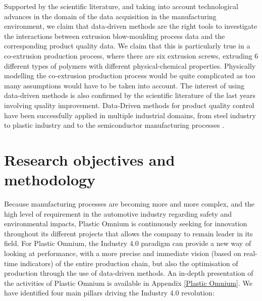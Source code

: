 Supported by the scientific literature, and taking into account technological advances in the domain of the data acquisition in the manufacturing environment, we claim that data-driven methods are the right tools to investigate the interactions between extrusion blow-moulding process data and the corresponding product quality data.  We claim that this is particularly true in a co-extrusion production process, where there are six extrusion screws, extruding 6 different types of polymers with different physical-chemical properties. Physically modelling the co-extrusion  production process would be quite complicated as too many assumptions would have to be taken into account. 
The interest of using data-driven methods is also confirmed by the scientific literature of the last years involving quality improvement. Data-Driven methods for product quality control have been successfully applied in multiple industrial domains, from steel industry \citep{lieber2013quality,li2018ensemble} to plastic industry \citep{chen2008neural,nagorny2017quality,nagorny2018generative,haeussler1996quality,tellaeche2013machine,sharma2017taguchi} and to the semiconductor manufacturing processes \citep{melhem2016regression,lenz2013data,jiang2020novel}.

\section{Research objectives and methodology} \label{Research objectives and methodology}

Because manufacturing processes are becoming more and more complex, and the high level of requirement in the automotive industry regarding safety and environmental impacts, Plastic Omnium is continuously seeking for innovation throughout its different projects that allows the company to remain leader in its field. For Plastic Omnium, the Industry 4.0 paradigm can provide a new way of looking at performance, with a more precise and immediate vision (based on real-time indicators) of the entire production chain, but also the optimisation of production through the use of data-driven methods. An in-depth presentation of the activities of Plastic Omnium is available in Appendix \ref{Plastic Omnium}. We have identified four main pillars driving the Industry 4.0 revolution:

